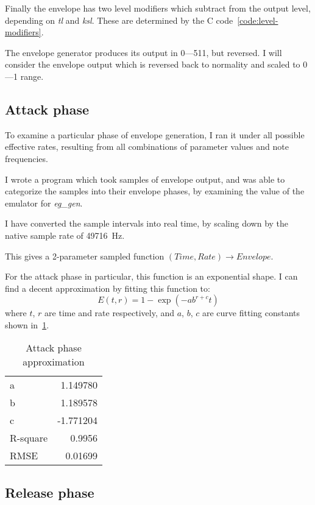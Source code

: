\documentclass[twoside,twocolumn]{article}
\begin{document}
Finally the envelope has two level modifiers which subtract from the output level,
depending on \emph{tl} and \emph{ksl}. These are determined by the C code~\ref{code:level-modifiers}.

The envelope generator produces its output in 0—511, but reversed. I will consider the
envelope output which is reversed back to normality and scaled to 0—1 range.

\subsection{Attack phase}\label{sec:attack-phase}

To examine a particular phase of envelope generation, I ran it under all possible
effective rates, resulting from all combinations of parameter values and note frequencies.

I wrote a program which took samples of envelope output, and was able to categorize the
samples into their envelope phases, by examining the value of the emulator for \emph{eg\_gen}.

I have converted the sample intervals into real time, by scaling down by the native sample
rate of 49716~Hz.

This gives a 2-parameter sampled function $(Time, Rate) \rightarrow Envelope$.

For the attack phase in particular, this function is an exponential shape.
I can find a decent approximation by fitting this function to:
\begin{equation}
E(t,r) = 1-\exp(-a b^{r+c} t)
\end{equation}
where $t$, $r$ are time and rate respectively, and $a$, $b$, $c$ are curve fitting constants
shown in~\ref{tab:env-attack-fit}.

\begin{table}
\begin{center}
\begin{tabular}{lr}
\toprule
a & 1.149780 \\
b & 1.189578 \\
c & -1.771204 \\
\midrule
R-square & 0.9956 \\
RMSE & 0.01699 \\
\bottomrule
\end{tabular}
\end{center}
\caption{Attack phase approximation}\label{tab:env-attack-fit}
\end{table}

\subsection{Release phase}\label{sec:release-phase}
\end{document}

